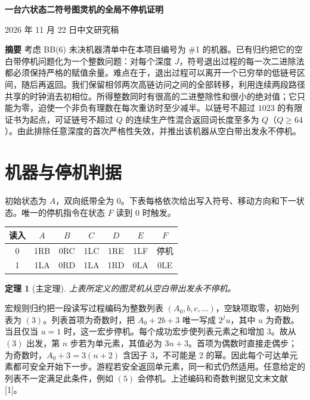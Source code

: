 \documentclass[UTF8,12pt,a4paper,fontset=fandol,scheme=plain]{ctexart}
\theoremstyle{cn}\newtheorem{thm}{定理}\newtheorem{lem}[thm]{引理}
\begin{document}
\thispagestyle{plain}
\begin{center}
{\LARGE\bfseries 一台六状态二符号图灵机的全局不停机证明\par}
\vspace{.45em}{\large 混合返回词的长度界与严格退出归纳\par}
\vspace{.65em}2026 年 11 月 22 日\qquad 中文研究稿
\end{center}
\noindent\textbf{摘要}\quad
考虑 BB(6) 未决机器清单中在本项目编号为 \#1 的机器。已有归约把它的空白带停机问题化为一个整数问题：对每个深度 \(J\)，符号退出过程的每一次二进除法都必须保持严格的赋值余量。难点在于，退出过程可以离开一个已穷举的低链号区间，随后再返回。我们保留相邻两次高链访问之间的全部转移，利用连续两段路径共享的时钟消去初相位。所得整数同时有很高的二进整除性和很小的绝对值；它只能为零，迫使一个非负有理数在每次重访时至少减半。以链号不超过 \(1023\) 的有限证书为起点，可证链号不超过 \(Q\) 的连续生产性混合返回词长度至多为 \(Q\)（\(Q\ge64\)）。由此排除任意深度的首次严格性失效，并推出该机器从空白带出发永不停机。

\section{机器与停机判据}
初始状态为 \(A\)，双向纸带全为 \(0\)。下表每格依次给出写入符号、移动方向和下一状态。唯一的停机指令在状态 \(F\) 读到 \(0\) 时触发。
\begin{center}
\begin{tabular}{c*{6}{c}}\toprule
读入 & \(A\)&\(B\)&\(C\)&\(D\)&\(E\)&\(F\)\\\midrule
0 & 1RB & 0RC & 1LC & 1RE & 1LF & 停机\\
1 & 1LA & 0RD & 1LA & 1RD & 0LA & 0LE\\\bottomrule
\end{tabular}
\end{center}
\begin{thm}[主定理]\label{main}上表所定义的图灵机从空白带出发永不停机。\end{thm}
宏规则归约把一段读写过程编码为整数列表 \((A_0,b,c,\ldots)\)，空缺项取零，初始列表为 \((3)\)。列表首项为奇数时，把 \(A_0+2b+3\) 唯一写成 \(2^j u\)，其中 \(u\) 为奇数。当且仅当 \(u=1\) 时，这一宏步停机。每个成功宏步使列表元素之和增加 3。故从 \((3)\) 出发，第 \(n\) 步若为单元素，其值必为 \(3n+3\)。首项为偶数时直接走偶步；为奇数时，\(A_0+3=3(n+2)\) 含因子 3，不可能是 2 的幂。因此每个可达单元素都可安全开始下一步。游程若安全返回单元素，同一和式仍然适用。任意给定的列表不一定满足此条件，例如 \((5)\) 会停机。上述编码和奇数判据见文末文献 [1]。
\end{document}
